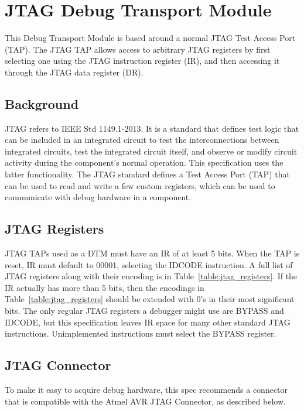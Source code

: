 \chapter{JTAG Debug Transport Module} \label{jtagdtm}

This Debug Transport Module is based around a normal JTAG Test Access Port
(TAP).  The JTAG TAP allows access to arbitrary JTAG registers by first
selecting one using the JTAG instruction register (IR), and then accessing it
through the JTAG data register (DR).

\section{Background}

JTAG refers to IEEE Std 1149.1-2013. It is a standard that defines test logic
that can be included in an integrated circuit to test the interconnections
between integrated circuits, test the integrated circuit itself, and observe or
modify circuit activity during the component’s normal operation.
This specification uses the latter functionality.
The JTAG standard defines a Test Access Port (TAP) that
can be used to read and write a few custom registers, which can be used to
communicate with debug hardware in a component.

\section{JTAG Registers}

JTAG TAPs used as a DTM must have an IR of at least 5 bits.
When the TAP is reset, IR must default to
00001, selecting the IDCODE instruction. A full list of JTAG registers along
with their encoding is in Table~\ref{table:jtag_registers}.
If the IR actually has more than 5 bits, then the encodings in
Table~\ref{table:jtag_registers} should be extended with 0's in their
most significant bits.
The only regular JTAG registers a debugger might use are BYPASS and IDCODE, but this
specification leaves IR space for many other standard JTAG instructions.
Unimplemented instructions must select the BYPASS register.



\section{JTAG Connector}

To make it easy to
acquire debug hardware, this spec recommends a connector that is compatible
with the Atmel AVR JTAG Connector, as described below.

